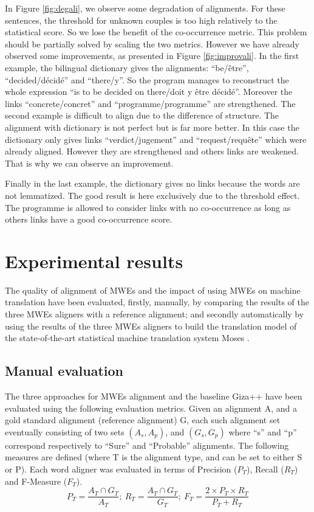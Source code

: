 \documentclass[output=paper,modfonts,nonflat]{langsci/langscibook}
\begin{document}
In Figure \ref{fig:degali}, we observe some degradation of alignments.
For these sentences, the threshold for unknown couples is too high relatively to the statistical score. 
So we lose the benefit of the co-occurrence metric. 
This problem should be partially solved by scaling the two metrics. However we have already observed some improvements, as presented in Figure \ref{fig:improvali}. In the first example, the bilingual dictionary gives the alignments: ``be/être'', ``decided/décidé'' and ``there/y''. So the program manages to reconstruct the whole expression ``is to be decided on there/doit y être décidé''. Moreover the links ``concrete/concret'' and ``programme/programme'' are strengthened. The second example is difficult to align due to the difference of structure. The alignment with dictionary is not perfect but is far more better. In this case the dictionary only gives links ``verdict/jugement'' and ``request/requête'' which were already aligned. However they are strengthened and others links are weakened. That is why we can observe an improvement.

Finally in the last example, the dictionary gives no links because the words are not lemmatized. The good result is here exclusively due to the threshold effect. The programme is allowed to consider links with no co-occurrence as long as others links have a good co-occurrence score.


\section{Experimental results}
The quality of alignment of MWEs and the impact of using MWEs on machine translation have been evaluated, firstly, manually, by comparing the results of the three MWEs aligners with a reference alignment;
and secondly automatically by using the results of the three MWEs aligners to build the translation model of the state-of-the-art statistical machine translation system Moses \citep{koehn2007moses}.


\subsection{Manual evaluation}

The three approaches for MWEs alignment and the baseline Giza++ \citep{och2000improved} have been evaluated using the following evaluation metrics. 
Given an alignment A, and a gold standard alignment (reference alignment) G, each such alignment set eventually consisting of two sets $(A_s, A_p)$, and $(G_s, G_p)$ where ``s'' and ``p'' correspond respectively to ``Sure'' and ``Probable'' alignments. 
The following measures are defined (where T is the alignment type, and can be set to either S or P). Each word aligner was evaluated in terms of Precision ($P_T$), Recall ($R_T$) and F-Measure ($F_T$).
\begin{equation}
P_T=\frac{A_T \cap G_T}{A_T} ;~
R_T=\frac{A_T \cap G_T}{G_T} ;~
F_T=\frac{2 \times P_T \times R_T}{P_T + R_T}
\label{equa:PRF}
\end{equation}
\end{document}
